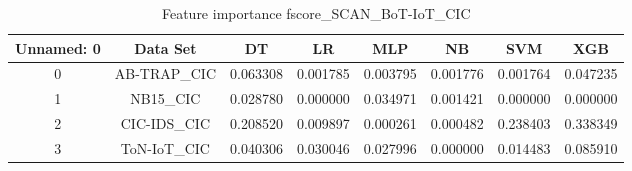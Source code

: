 \begin{table}[H]
\centering
\caption{Feature importance fscore_SCAN_BoT-IoT_CIC}
\label{fscore_SCAN_BoT-IoT_CIC}
\begin{tabular}{cccccccc}
\toprule
 Unnamed: 0 &    Data Set &       DT &       LR &      MLP &       NB &      SVM &      XGB \\
\midrule
          0 & AB-TRAP\_CIC & 0.063308 & 0.001785 & 0.003795 & 0.001776 & 0.001764 & 0.047235 \\
          1 &    NB15\_CIC & 0.028780 & 0.000000 & 0.034971 & 0.001421 & 0.000000 & 0.000000 \\
          2 & CIC-IDS\_CIC & 0.208520 & 0.009897 & 0.000261 & 0.000482 & 0.238403 & 0.338349 \\
          3 & ToN-IoT\_CIC & 0.040306 & 0.030046 & 0.027996 & 0.000000 & 0.014483 & 0.085910 \\
\bottomrule
\end{tabular}
\end{table}

